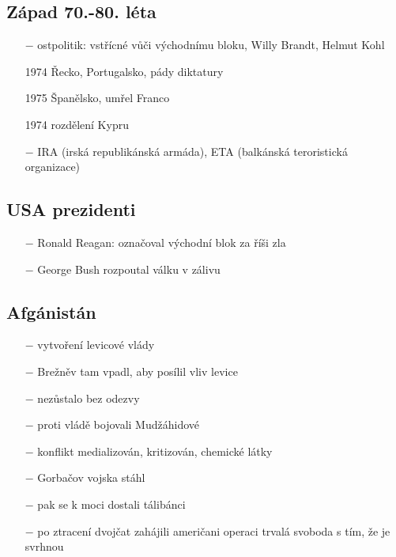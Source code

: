 \documentclass{article}
\begin{document}
\subsection*{Západ 70.-80. léta}
\begin{itemize}
    \vspace{-0.5em}
    \setlength\itemsep{0.15em}
    \item[$-$] ostpolitik: vstřícné vůči východnímu bloku, Willy Brandt, Helmut Kohl
    \item[1974] Řecko, Portugalsko, pády diktatury
    \item[1975] Španělsko, umřel Franco
    \item[1974]  rozdělení Kypru
    \item[$-$] IRA (irská republikánská armáda), ETA (balkánská teroristická organizace)
\end{itemize}

\subsection*{USA prezidenti}
\begin{itemize}
    \vspace{-0.5em}
    \setlength\itemsep{0.15em}
    \item[$-$] Ronald Reagan: označoval východní blok za říši zla
    \item[$-$] George Bush rozpoutal válku v zálivu
\end{itemize}

\subsection*{Afgánistán}
\begin{itemize}
    \vspace{-0.5em}
    \setlength\itemsep{0.15em}
    \item[$-$] vytvoření levicové vlády
    \item[$-$] Brežněv tam vpadl, aby posílil vliv levice
    \item[$-$] nezůstalo  bez odezvy
    \item[$-$] proti vládě bojovali Mudžáhidové
    \item[$-$] konflikt medializován, kritizován, chemické látky
    \item[$-$] Gorbačov vojska stáhl
    \item[$-$] pak se k moci dostali tálibánci
    \item[$-$] po ztracení dvojčat zahájili američani operaci trvalá svoboda s tím, že je svrhnou

\end{itemize}
\end{document}
